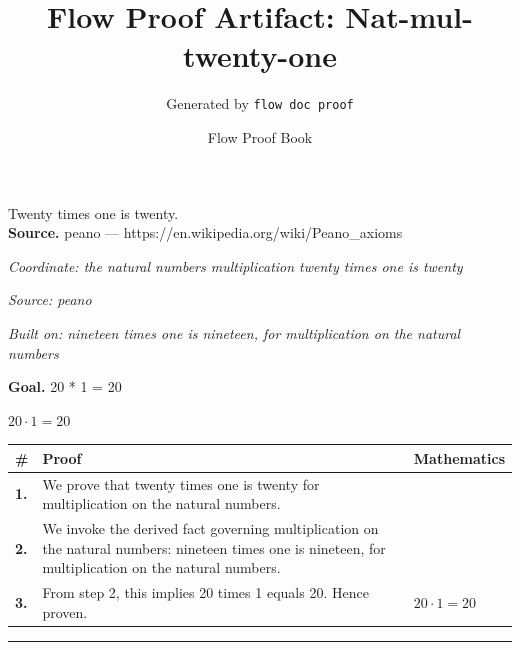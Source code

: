 \documentclass[11pt]{article}
\title{Flow Proof Artifact: Nat-mul-twenty-one}
\author{Generated by \texttt{flow doc proof}}
\date{Flow Proof Book}
\theoremstyle{definition}
\begin{document}
\maketitle
Twenty times one is twenty.\\[0.5em]
\textbf{Source.} peano — https://en.wikipedia.org/wiki/Peano\_axioms\\[0.5em]
\bigskip
{}\par
\smallskip\noindent\textit{Coordinate: the natural numbers \cdot multiplication \cdot twenty times one is twenty}\par
\smallskip\noindent\textit{Source: peano}\par
\smallskip\noindent\textit{Built on: nineteen times one is nineteen, for multiplication on the natural numbers}\par
\medskip
\noindent\textbf{Goal.} 20 * 1 = 20\par
\noindent$\displaystyle 20 \cdot 1 = 20$\par
\medskip
\noindent
\begin{tabular}{@{} >{\raggedright\arraybackslash}p{} >{\raggedright\arraybackslash}p{} >{\raggedleft\arraybackslash}p{} @{}}
\textbf{\#} & \textbf{Proof} & \textbf{Mathematics} \\
\midrule
\textbf{1.} & We prove that twenty times one is twenty for multiplication on the natural numbers. & \\[0.45em]
\textbf{2.} & We invoke the derived fact governing multiplication on the natural numbers: nineteen times one is nineteen, for multiplication on the natural numbers. & \\[0.45em]
\textbf{3.} & From step 2, this implies 20 times 1 equals 20. Hence proven. & $\displaystyle 20 \cdot 1 = 20$ \\[0.45em]
\bottomrule
\end{tabular}
\label{thm:Nat-multiplication-twenty_times_one_is_twenty}
\par\medskip\hrule
\end{document}
